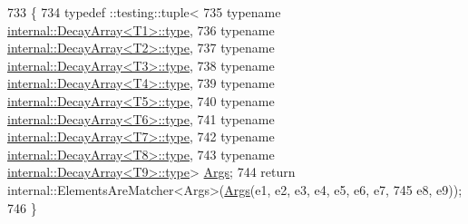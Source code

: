 \begin{DoxyCode}
733                                                                           \{
734   typedef ::testing::tuple<
735       \textcolor{keyword}{typename} \hyperlink{namespaceupload_a4fc56f0dd6613be15c3c4dc3af3619ce}{internal::DecayArray<T1>::type},
736       \textcolor{keyword}{typename} \hyperlink{namespaceupload_a4fc56f0dd6613be15c3c4dc3af3619ce}{internal::DecayArray<T2>::type},
737       \textcolor{keyword}{typename} \hyperlink{namespaceupload_a4fc56f0dd6613be15c3c4dc3af3619ce}{internal::DecayArray<T3>::type},
738       \textcolor{keyword}{typename} \hyperlink{namespaceupload_a4fc56f0dd6613be15c3c4dc3af3619ce}{internal::DecayArray<T4>::type},
739       \textcolor{keyword}{typename} \hyperlink{namespaceupload_a4fc56f0dd6613be15c3c4dc3af3619ce}{internal::DecayArray<T5>::type},
740       \textcolor{keyword}{typename} \hyperlink{namespaceupload_a4fc56f0dd6613be15c3c4dc3af3619ce}{internal::DecayArray<T6>::type},
741       \textcolor{keyword}{typename} \hyperlink{namespaceupload_a4fc56f0dd6613be15c3c4dc3af3619ce}{internal::DecayArray<T7>::type},
742       \textcolor{keyword}{typename} \hyperlink{namespaceupload_a4fc56f0dd6613be15c3c4dc3af3619ce}{internal::DecayArray<T8>::type},
743       \textcolor{keyword}{typename} \hyperlink{namespaceupload_a4fc56f0dd6613be15c3c4dc3af3619ce}{internal::DecayArray<T9>::type}> 
      \hyperlink{namespacetesting_a09ac462e8d6ed468cbfaa9c767aee0aa}{Args};
744   \textcolor{keywordflow}{return} internal::ElementsAreMatcher<Args>(\hyperlink{namespacetesting_a09ac462e8d6ed468cbfaa9c767aee0aa}{Args}(e1, e2, e3, e4, e5, e6, e7,
745       e8, e9));
746 \}
\end{DoxyCode}
